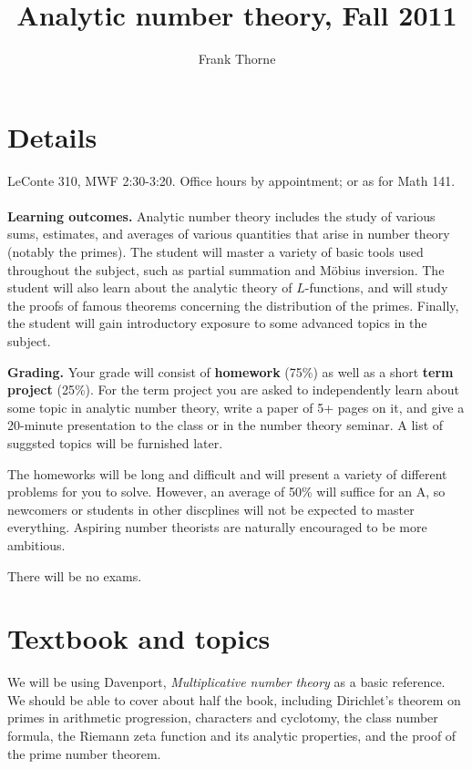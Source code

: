 \documentclass[11pt]{amsart}
\theoremstyle{remark}
\numberwithin{theorem}{section} \numberwithin{equation}{section}
\begin{document}
\title[Analytic number theory]
{Analytic number theory, Fall 2011}
\author{Frank Thorne}
\address{Department of Mathematics, University of South Carolina,
1523 Greene Street, Columbia, SC 29208}

\maketitle
\section{Details}
LeConte 310, MWF 2:30-3:20. Office hours by appointment; or as for Math 141.
\\
\\
{\bf Learning outcomes.} Analytic number theory includes the study of various sums, estimates, and averages of various quantities that
arise in number theory (notably the primes). The student will master a variety of basic tools used throughout the subject, such as partial
summation and M\"obius inversion. The student will also learn about the analytic theory of $L$-functions, and will study the proofs of
famous theorems concerning the distribution of the primes. Finally, the student will gain introductory exposure to some advanced topics
in the subject.

{\bf Grading.} Your grade will consist of {\bf homework} (75\%) as well as a short {\bf term project} (25\%). For the term project you are asked to
independently learn about some topic in analytic number theory, write a paper of 5+ pages on it, and give a 20-minute presentation to the class
or in the number theory seminar. A list of suggsted topics will be furnished later.

The homeworks will be long and difficult and will present a variety of different problems for you to solve. However,
an average of 50\% will suffice for an A, so
newcomers or students in other discplines will not be expected to master everything. Aspiring number theorists are naturally encouraged to be more ambitious.

There will be no exams.

\section{Textbook and topics}
We will be using Davenport, {\itshape Multiplicative number theory} as a basic reference. We should be able to cover about half the book, including
Dirichlet's theorem on primes in arithmetic progression, characters and cyclotomy, the class number formula, the Riemann zeta function and its
analytic properties, and the proof of the prime number theorem.
\end{document}

